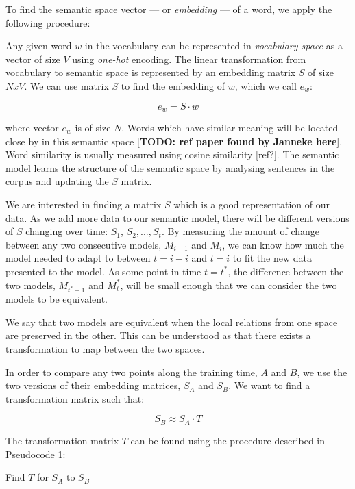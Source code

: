 \documentclass{article} %
\begin{document}
To find the semantic space vector --- or \textit{embedding} --- of a word, we apply the following procedure:

Any given word $w$ in the vocabulary can be represented in \textit{vocabulary space} as a vector of size $V$ using \textit{one-hot} encoding. The linear transformation from vocabulary to semantic space is represented by an embedding matrix $S$ of size $NxV$. We can use matrix $S$ to find the embedding of $w$, which we call $e_w$:

$$e_w = S \cdot w$$

where vector $e_w$ is of size $N$. Words which have similar meaning will be located close by in this semantic space [\textbf{TODO: ref paper found by Janneke here}]. Word similarity is usually measured using cosine similarity [ref?]. The semantic model learns the structure of the semantic space by analysing sentences in the corpus and updating the $S$ matrix.

We are interested in finding a matrix $S$ which is a good representation of our data. As we add more data to our semantic model, there will be different versions of $S$ changing over time: $S_1$, $S_2, ..., S_t$. By measuring the amount of change between any two consecutive models, $M_{i-1}$ and $M_i$, we can know how much the model needed to adapt to between $t=i-i$ and $t=i$ to fit the new data presented to the model. As some point in time $t=t^\ast$, the difference between the two models, $M_{t^\ast-1}$ and $M_t^\ast$, will be small enough that we can consider the two models to be equivalent.

We say that two models are equivalent when the local relations from one space are preserved in the other. This can be understood as that there exists a transformation to map between the two spaces.

In order to compare any two points along the training time, $A$ and $B$, we use the two versions of their embedding matrices, $S_A$ and $S_B$. We want to find a transformation matrix such that:

$$S_B \approx S_A \cdot T$$

The transformation matrix $T$ can be found using the procedure described in Pseudocode 1:

\begin{algorithm}[H]
 \caption{Find $T$ for $S_A$ to $S_B$}
\end{algorithm}
\end{document}
